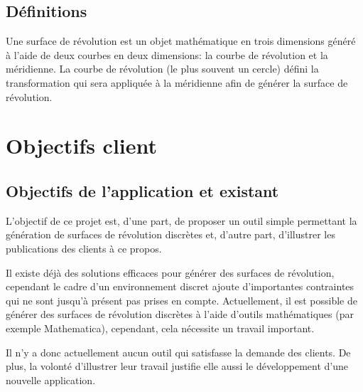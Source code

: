 \documentclass{scrartcl}
\begin{document}
	\subsection{Définitions}
		Une surface de révolution est un objet mathématique en trois dimensions généré à l'aide de deux courbes en deux dimensions: la courbe de révolution et la méridienne. La courbe de révolution (le plus souvent un cercle) défini la transformation qui sera appliquée à la méridienne afin de générer la surface de révolution.


\section{Objectifs client}

	\subsection{Objectifs de l'application et existant}
		L'objectif de ce projet est, d'une part, de proposer un outil simple permettant la génération de surfaces de révolution discrètes et, d'autre part, d'illustrer les publications des clients à ce propos. 

Il existe déjà des solutions efficaces pour générer des surfaces de révolution, cependant le cadre d'un environnement discret ajoute d'importantes contraintes qui ne sont jusqu'à présent pas prises en compte. Actuellement, il est possible de générer des surfaces de révolution discrètes à l'aide d'outils mathématiques (par exemple Mathematica), cependant, cela nécessite un travail important. 

Il n'y a donc actuellement aucun outil qui satisfasse la demande des clients. De plus, la volonté d'illustrer leur travail justifie elle aussi le développement d'une nouvelle application.
\end{document}
